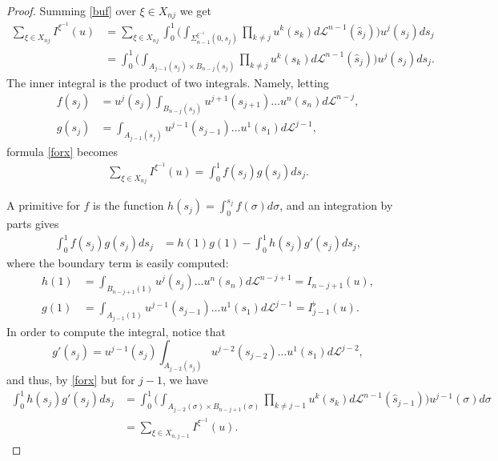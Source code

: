 \documentclass[12pt, reqno]{amsart}
\theoremstyle{plain}
\theoremstyle{definition}
\theoremstyle{remark}
\numberwithin{equation}{section}
\renewcommand{\L}{\mathcal{L}}
\newcommand{\s}{\sigma}
\newcommand{\0}{\theta}
\newcommand{\1}{{-1}}
\renewcommand{\=}{\coloneqq}
\renewcommand{\.}{\dots}
\begin{document}
\begin{proof}
 Summing \eqref{buf} over  $\xi\in X_{nj}$  we   get
  \begin{equation}\label{forx}
 \begin{split}
 \sum_{\xi\in X_{nj}} I^{ \xi^\1}(u) &
 =
 \sum_{\xi\in X_{nj}}  \int_0^1 \Big(   \int_{\Sigma_{n-1} ^{ \xi^{-1}} (0,s_j) }\prod_{k\neq j}   u^{k} (s_k ) d\L^{n-1}(\widehat s_j)   \Big) u^j(s_j) ds_j
 \\
 &
 =   \int_0^1 \Big(   \int_
 {A_{j-1}(s_j)\times B_{n-j}(s_j) }
 \prod_{k\neq j}   u^{k} (s_k ) d\L^{n-1}(\widehat s_j)  \Big) u^j(s_j) ds_j.
 \end{split}
 \end{equation}
 The inner integral is the product of two integrals. Namely, letting
\begin{equation}\label{fg}
\begin{split}
f(s_j) & =  u^j(s_j)   \int_{ B_{n-j}  (s_j)} u^{j+1} (s_{j+1} ) \. u^{n} (s_{n} ) d\L^{n-j},
\\
g(s_j)&=     \int_{
A_{j-1} (s_j) }  u^ {j-1} (s_{j-1} )\dots u^ 1 (s_1) d\L^{j-1} ,
\end{split}
 \end{equation}
 formula \eqref{forx}
 becomes
  \begin{equation}\label{forx1}
 \begin{split}
 \sum_{\xi\in X_{nj} }I^{ \xi^\1}(u)   =   \int_0^1  f(s_j)   g(s_j ) ds_j .
 \end{split}
 \end{equation}


 A primitive for $f$ is the function    $h(s_j) = \int_0^ {s_j}  f(\sigma) d\sigma $, and an integration by parts gives
 \[
 \begin{split}
  \int_0^1  f(s_j)   g(s_j ) ds_j& = h(1) g(1)  -\int_0^1 h(s_j) g'(s_j) ds_j,
  \end{split}
\]
where the boundary term is easily computed:
\[
\begin{split}
  h(1)  & =   \int_{B_{n-j+1} (1) }  u ^{j} (s_{j})\dots u^ n (s_n) d\L^{n-j+1}  = I_{n-j+1}(u) ,
\\
  g(1) &=  \int_{A_{j-1}(1)  }  u^{j-1} (s_{j-1} )\dots u^{1} (s_{1} ) d\L^{j-1}    = I^\flat_{j-1}(u).
\end{split}
\]
In order to compute the integral, notice that
\[
   g'(s_j)=   u^{j-1} (s_{j})  \int_{A_{j-2}(s_j) }  u^ {j-2} (s_{j-2} )\dots u^1  (s_{1} ) d\L^{j-2},
\]
and thus, by \eqref{forx} but for $j-1$, we have
\[
\begin{split}
\int_0^1 h(s_j) g'(s_j) ds_j& =\int_0^1    \Big(   \int_{A_{j-2}(\sigma) \times B_{n-j+1} (\s) } \prod_{k\neq j-1}   u^{k} (s_k ) d\L^{n-1}(\widehat s_{j-1} ) \Big)  u ^{j-1} (\sigma ) d\sigma
\\
&=
 \sum_{\xi\in X_{n,j-1}}  I^{ \xi^\1}(u) .
\end{split}
\]



\end{proof}
\end{document}
